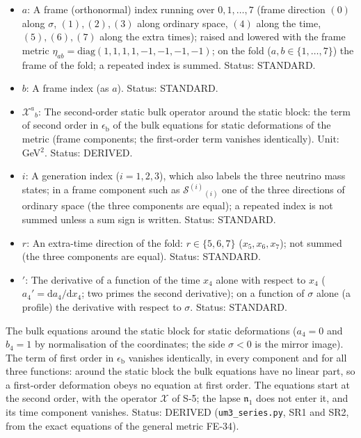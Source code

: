 \documentclass[
  10pt,
]{article}
\begin{document}
\begin{itemize}
  \(\mathcal{T}_{\mathrm{bulk}}\): The energy-momentum tensor of all
  sources of the bulk (with the corrected weights dirac16complex alone,
  \(\mathcal{T}_\Psi\); with the author's original weights also the
  stabiliser); \(\mathcal{T}_{\mathrm{bulk}}{}^{(0)}{}_b\) is its flux
  along \(\sigma\) (frame components). Unit: GeV\(^8\). Status:
  STANDARD.
\item
  \(a\): A frame (orthonormal) index running over \(0, 1, \dots, 7\)
  (frame direction \((0)\) along \(\sigma\), \((1), (2), (3)\) along
  ordinary space, \((4)\) along the time, \((5), (6), (7)\) along the
  extra times); raised and lowered with the frame metric
  \(\eta_{ab} = \mathrm{diag}(1, 1, 1, 1, -1, -1, -1, -1)\); on the fold
  (\(a, b \in \{1, \dots, 7\}\)) the frame of the fold; a repeated index
  is summed. Status: STANDARD.
\item
  \(b\): A frame index (as \(a\)). Status: STANDARD.
\item
  \(\mathcal{X}^a{}_b\): The second-order static bulk operator around
  the static block: the term of second order in
  \(\epsilon_{\mathrm{b}}\) of the bulk equations for static
  deformations of the metric (frame components; the first-order term
  vanishes identically). Unit: GeV\(^2\). Status: DERIVED.
\item
  \(i\): A generation index (\(i = 1, 2, 3\)), which also labels the
  three neutrino mass states; in a frame component such as
  \(\mathcal{S}^{(i)}{}_{(i)}\) one of the three directions of ordinary
  space (the three components are equal); a repeated index is not summed
  unless a sum sign is written. Status: STANDARD.
\item
  \(r\): An extra-time direction of the fold: \(r \in \{5, 6, 7\}\)
  (\(x_5, x_6, x_7\)); not summed (the three components are equal).
  Status: STANDARD.
\item
  \({}'\): The derivative of a function of the time \(x_4\) alone with
  respect to \(x_4\) (\(a_4' = \mathrm{d}a_4/\mathrm{d}x_4\); two primes
  the second derivative); on a function of \(\sigma\) alone (a profile)
  the derivative with respect to \(\sigma\). Status: STANDARD.
\end{itemize}

The bulk equations around the static block for static deformations
(\(a_4 = 0\) and \(b_4 = 1\) by normalisation of the coordinates; the
side \(\sigma < 0\) is the mirror image). The term of first order in
\(\epsilon_{\mathrm{b}}\) vanishes identically, in every component and
for all three functions: around the static block the bulk equations have
no linear part, so a first-order deformation obeys no equation at first
order. The equations start at the second order, with the operator
\(\mathcal{X}\) of S-5; the lapse \(\mathfrak{n}_1\) does not enter it,
and its time component vanishes. Status: DERIVED
(\texttt{um3\_series.py}, SR1 and SR2, from the exact equations of the
general metric FE-34).
\end{document}
